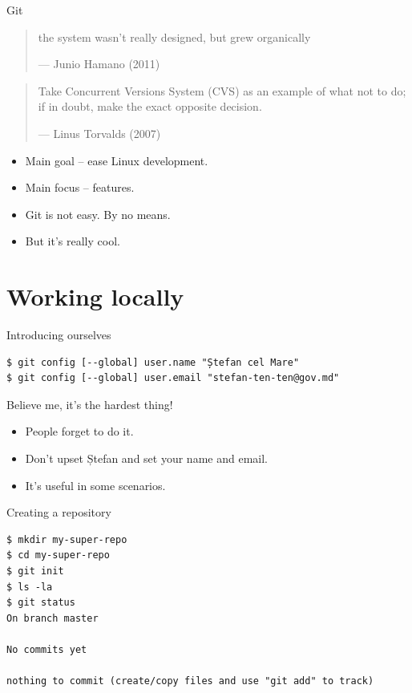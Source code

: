 \documentclass[presentation,aspectratio=169,smaller]{beamer}
\begin{document}
\begin{frame}[label={sec:orge78d12a}]{Git}
\begin{quote}
the system wasn't really designed, but grew organically

--- Junio Hamano (2011)
\end{quote}

\begin{quote}
Take Concurrent Versions System (CVS) as an example of what not to do; if in
doubt, make the exact opposite decision.

--- Linus Torvalds (2007)
\end{quote}

\begin{itemize}
\item Main goal -- ease Linux development.
\item Main focus -- features.
\item Git is not easy. By no means.
\item But it's really cool.
\end{itemize}
\end{frame}

\section{Working locally}
\label{sec:org1aafb1b}

\begin{frame}[label={sec:org99ef0f0},fragile]{Introducing ourselves}
 \begin{verbatim}
$ git config [--global] user.name "Ștefan cel Mare"
$ git config [--global] user.email "stefan-ten-ten@gov.md"
\end{verbatim}

\pause

Believe me, it's the hardest thing!

\begin{itemize}
\item People forget to do it.
\item Don't upset Ștefan and set your name and email.
\item It's useful in some scenarios.
\end{itemize}
\end{frame}

\begin{frame}[label={sec:org078c144},fragile]{Creating a repository}
 \begin{verbatim}
$ mkdir my-super-repo
$ cd my-super-repo
$ git init
$ ls -la
$ git status
On branch master

No commits yet

nothing to commit (create/copy files and use "git add" to track)

\end{verbatim}
\end{frame}
\end{document}
